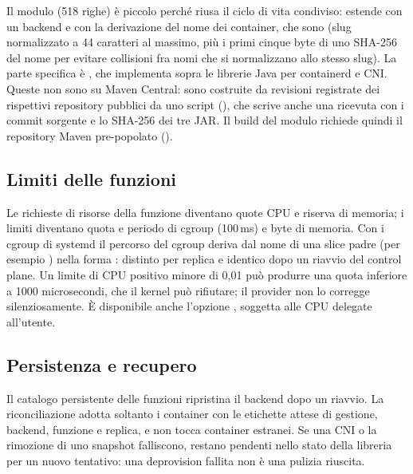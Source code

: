 Il modulo (518 righe) \`e piccolo perch\'e riusa il ciclo di vita condiviso:
 estende
 con un backend  e con la
derivazione del nome dei container, che sono 
(slug normalizzato a 44 caratteri al massimo, pi\`u i primi cinque byte di uno
SHA-256 del nome per evitare collisioni fra nomi che si normalizzano allo stesso
slug). La parte specifica \`e , che implementa
 sopra le librerie Java per containerd e CNI.
Queste non sono su Maven Central: sono costruite da revisioni registrate dei
rispettivi repository pubblici da uno script
(), che scrive anche una
ricevuta con i commit sorgente e lo SHA-256 dei tre JAR. Il build del modulo
richiede quindi il repository Maven pre-popolato ().

\subsection{Limiti delle funzioni}

Le richieste di risorse della funzione diventano quote CPU e riserva di memoria;
i limiti diventano quota e periodo di cgroup (100\,ms) e byte di memoria. Con
i cgroup di systemd il percorso del cgroup deriva dal nome di una slice padre
(per esempio ) nella forma
: distinto per replica e
identico dopo un riavvio del control plane. Un limite di CPU positivo minore
di 0,01 pu\`o produrre una quota inferiore a 1000 microsecondi, che il kernel
pu\`o rifiutare; il provider non lo corregge silenziosamente. \`E disponibile
anche l'opzione , soggetta alle CPU delegate all'utente.

\subsection{Persistenza e recupero}

Il catalogo persistente delle funzioni ripristina il backend 
dopo un riavvio. La riconciliazione adotta soltanto i container con le
etichette attese di gestione, backend, funzione e replica, e non tocca
container estranei. Se una  CNI o la rimozione di uno snapshot
falliscono, restano pendenti nello stato della libreria per un nuovo tentativo:
una deprovision fallita non \`e una pulizia riuscita.

